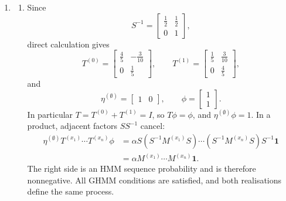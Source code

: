 \begin{solution}[ex:p3-4]
\begin{enumerate}
      \item
        \begin{enumerate}
          \item Since
            \[
              S^{-1}=
                \begin{bmatrix}\tfrac12&\tfrac12\\0&1\end{bmatrix},
            \]
            direct calculation gives
            \[
              T^{(0)}=
                \begin{bmatrix}\tfrac45&-\tfrac3{10}\\0&\tfrac15\end{bmatrix},
              \qquad
              T^{(1)}=
                \begin{bmatrix}\tfrac15&\tfrac3{10}\\0&\tfrac45\end{bmatrix},
            \]
            and
            \[
              \eta^{(\emptyset)}=\begin{bmatrix}1&0\end{bmatrix},
              \qquad
              \phi=\begin{bmatrix}1\\1\end{bmatrix}.
            \]
            In particular $T=T^{(0)}+T^{(1)}=I$, so $T\phi=\phi$, and
            $\eta^{(\emptyset)}\phi=1$. In a product, adjacent factors
            $SS^{-1}$ cancel:
            \[
              \begin{aligned}
                \eta^{(\emptyset)}
                  T^{(x_1)}\cdots T^{(x_n)}\phi
                  &=
                  \alpha S(S^{-1}M^{(x_1)}S)\cdots
                    (S^{-1}M^{(x_n)}S)S^{-1}\mathbf1\\
                  &=\alpha M^{(x_1)}\cdots M^{(x_n)}\mathbf1.
              \end{aligned}
            \]
            The right side is an HMM sequence probability and is therefore
            nonnegative. All GHMM conditions are satisfied, and both
            realisations define the same process.


\end{enumerate}
\end{enumerate}
\end{solution}
